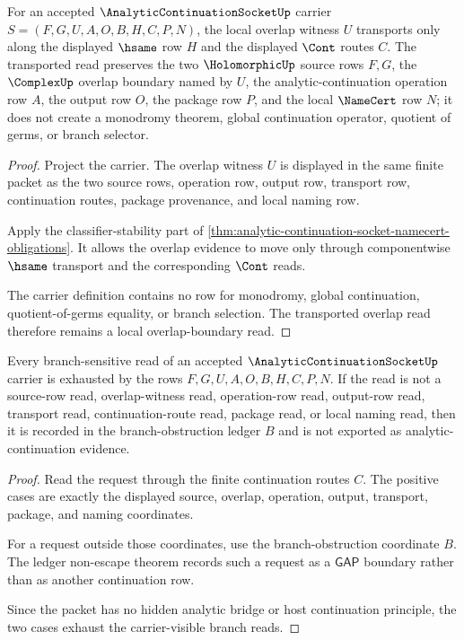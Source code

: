 \begin{theorem}
\label{thm:analytic-continuation-socket-overlap-transport}
For an accepted $\AnalyticContinuationSocketUp$ carrier $S=(F,G,U,A,O,B,H,C,P,N)$, the local overlap witness $U$ transports only along the displayed $\hsame$ row $H$ and the displayed $\Cont$ routes $C$. The transported read preserves the two $\HolomorphicUp$ source rows $F,G$, the $\ComplexUp$ overlap boundary named by $U$, the analytic-continuation operation row $A$, the output row $O$, the package row $P$, and the local $\NameCert$ row $N$; it does not create a monodromy theorem, global continuation operator, quotient of germs, or branch selector.
\end{theorem}
\begin{proof}
Project the carrier. The overlap witness $U$ is displayed in the same finite packet as the two source rows, operation row, output row, transport row, continuation routes, package provenance, and local naming row.

Apply the classifier-stability part of \autoref{thm:analytic-continuation-socket-namecert-obligations}. It allows the overlap evidence to move only through componentwise $\hsame$ transport and the corresponding $\Cont$ reads.

The carrier definition contains no row for monodromy, global continuation, quotient-of-germs equality, or branch selection. The transported overlap read therefore remains a local overlap-boundary read.
\end{proof}

\begin{theorem}
\label{thm:analytic-continuation-socket-branch-ledger-exhaustion}
Every branch-sensitive read of an accepted $\AnalyticContinuationSocketUp$ carrier is exhausted by the rows $F,G,U,A,O,B,H,C,P,N$. If the read is not a source-row read, overlap-witness read, operation-row read, output-row read, transport read, continuation-route read, package read, or local naming read, then it is recorded in the branch-obstruction ledger $B$ and is not exported as analytic-continuation evidence.
\end{theorem}
\begin{proof}
Read the request through the finite continuation routes $C$. The positive cases are exactly the displayed source, overlap, operation, output, transport, package, and naming coordinates.

For a request outside those coordinates, use the branch-obstruction coordinate $B$. The ledger non-escape theorem records such a request as a $\mathsf{GAP}$ boundary rather than as another continuation row.

Since the packet has no hidden analytic bridge or host continuation principle, the two cases exhaust the carrier-visible branch reads.
\end{proof}


